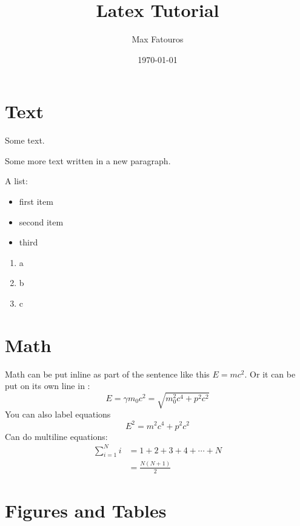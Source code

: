\documentclass[12pt]{report}
\title{Latex Tutorial}
\author{Max Fatouros}
\date{\today}
\begin{document}
\maketitle

\tableofcontents
\newpage


\section{Text}\label{sec:text}
    Some text.

    Some more text written in a new paragraph.

    A list:
    \begin{itemize}
        \item first item
        \item second item
        \item third
    \end{itemize}

    \begin{enumerate}
        \item a
        \item b
        \item c
    \end{enumerate}


\section{Math}\label{sec:math}
    Math can be put inline as part of the sentence like this $E = mc^2$. Or it can be put on its own line in :
    \[
        E = \gamma m_0c^2 = \sqrt{m_0^2c^4 + p^2c^2}
    \]
    You can also label equations
    \begin{equation}\label{eq:energy-momentum}
        E^2 = m^2c^4 + p^2c^2
    \end{equation}
    Can do multiline equations:
    \begin{align*}
        \sum^N_{i=1} i &= 1 + 2 + 3 + 4 + \cdots + N\\
                       &= \frac{N(N+1)}{2}
    \end{align*}

\section{Figures and Tables}
\end{document}
